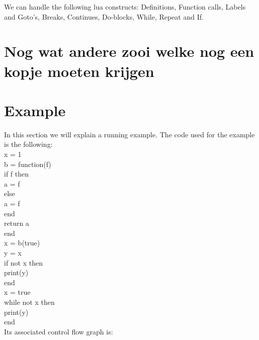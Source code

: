 \documentclass[10pt]{article}
\begin{document}
We can handle the following lua constructs: Definitions, Function calls, Labels and Goto's, Breaks, Continues, Do-blocks, While, Repeat and If.

\section{Nog wat andere zooi welke nog een kopje moeten krijgen}

\section{Example}
In this section we will explain a running example. The code used for the example is the following:\\

x = 1\\
b = function(f)\\
if f then\\
a = f\\
else \\
a = f\\
end\\
return a\\
end\\
x = b(true)\\
y = x\\
if not x then\\
print(y)\\
end\\
x = true\\
while not x then\\
print(y)\\
end\\

Its associated control flow graph is:
\end{document}

